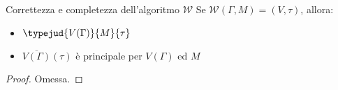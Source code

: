 \documentclass[a4paper, 12pt]{report}
\begin{document}
    \begin{framedthm}{Correttezza e completezza dell'algoritmo $\mathcal W$}
        Se $\mathcal W (\Gamma, M) = (V, \tau)$, allora:
        
        \begin{itemize}
            \item $\typejud{V(\Gamma)}{M}{\tau}$
            \item $\overline{V(\Gamma)}(\tau)$ è principale per $V(\Gamma)$ ed $M$
        \end{itemize}
    \end{framedthm}

    \begin{proof}
        Omessa.
    \end{proof}
\end{document}
